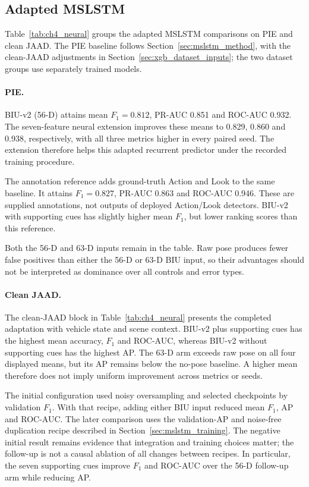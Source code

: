 \subsection{Adapted MSLSTM}

Table~\ref{tab:ch4_neural} groups the adapted MSLSTM comparisons on PIE and clean
JAAD. The PIE baseline follows Section~\ref{sec:mslstm_method}, with the clean-JAAD
adjustments in Section~\ref{sec:xgb_dataset_inputs}; the two
dataset groups use separately trained models.


\paragraph{PIE.}
BIU-v2 (56-D) attains mean $F_1=0.812$, PR-AUC 0.851 and ROC-AUC 0.932.
The seven-feature neural extension improves these means to 0.829, 0.860 and 0.938,
respectively, with all three metrics higher in every paired seed. The extension therefore
helps this adapted recurrent predictor under the recorded training procedure.

The annotation reference adds ground-truth Action and Look to the same baseline.
It attains $F_1=0.827$, PR-AUC 0.863 and ROC-AUC 0.946. These are supplied
annotations, not outputs of deployed Action/Look detectors. BIU-v2 with supporting cues has slightly higher mean $F_1$, but lower ranking scores than this reference.

Both the 56-D and 63-D inputs remain in the table.
Raw pose produces fewer false positives than either the 56-D or 63-D BIU input,
so their advantages should not be interpreted as dominance over all controls and error types.


\paragraph{Clean JAAD.}
The clean-JAAD block in Table~\ref{tab:ch4_neural} presents the completed adaptation
with vehicle state and scene context. BIU-v2 plus supporting cues has the highest mean accuracy, $F_1$
and ROC-AUC, whereas BIU-v2 without supporting cues has the highest AP. The 63-D arm exceeds raw
pose on all four displayed means, but its AP remains below the no-pose baseline.
A higher mean therefore does not imply uniform improvement across metrics or seeds.

The initial configuration used noisy oversampling and selected checkpoints by validation
$F_1$. With that recipe, adding either BIU input reduced mean $F_1$, AP and ROC-AUC. The later comparison
uses the validation-AP and noise-free duplication recipe described in
Section~\ref{sec:mslstm_training}. The negative initial result remains evidence that
integration and training choices matter; the follow-up is not a causal ablation of all
changes between recipes. In particular, the seven supporting cues improve $F_1$ and
ROC-AUC over the 56-D follow-up arm while reducing AP.

